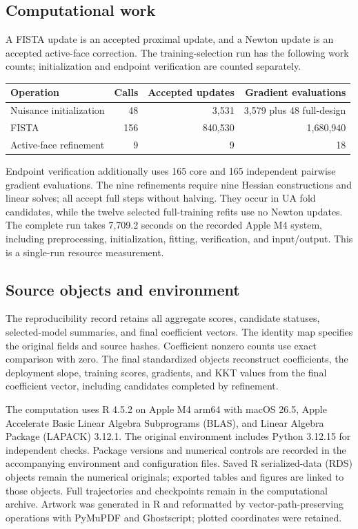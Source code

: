 \subsection{Computational work}
A FISTA update is an accepted proximal update, and a Newton update is an accepted active-face correction. The training-selection run has the following work counts; initialization and endpoint verification are counted separately.
\begin{center}
\small
\begin{tabular}{@{}lrrr@{}}
\toprule
Operation & Calls & Accepted updates & Gradient evaluations \\
\midrule
Nuisance initialization & 48 & 3,531 & 3,579 plus 48 full-design \\
FISTA & 156 & 840,530 & 1,680,940 \\
Active-face refinement & 9 & 9 & 18 \\
\bottomrule
\end{tabular}
\end{center}
Endpoint verification additionally uses 165 core and 165 independent pairwise gradient evaluations. The nine refinements require nine Hessian constructions and linear solves; all accept full steps without halving. They occur in UA fold candidates, while the twelve selected full-training refits use no Newton updates. The complete run takes 7,709.2 seconds on the recorded Apple M4 system, including preprocessing, initialization, fitting, verification, and input/output. This is a single-run resource measurement.

\subsection{Source objects and environment}
The reproducibility record retains all aggregate scores, candidate statuses, selected-model summaries, and final coefficient vectors. The identity map specifies the original fields and source hashes. Coefficient nonzero counts use exact comparison with zero. The final standardized objects reconstruct coefficients, the deployment slope, training scores, gradients, and KKT values from the final coefficient vector, including candidates completed by refinement.

The computation uses R 4.5.2 on Apple M4 arm64 with macOS 26.5, Apple Accelerate Basic Linear Algebra Subprograms (BLAS), and Linear Algebra Package (LAPACK) 3.12.1. The original environment includes Python 3.12.15 for independent checks. Package versions and numerical controls are recorded in the accompanying environment and configuration files. Saved R serialized-data (RDS) objects remain the numerical originals; exported tables and figures are linked to those objects. Full trajectories and checkpoints remain in the computational archive. Artwork was generated in R and reformatted by vector-path-preserving operations with PyMuPDF and Ghostscript; plotted coordinates were retained.

